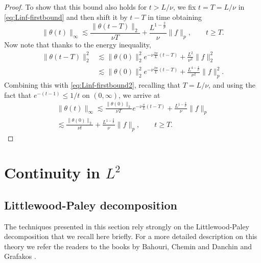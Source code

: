 \documentclass{amsart}
\numberwithin{Theorem}{section}
\theoremstyle{definition}
\theoremstyle{remark}
\renewcommand{\th}{\theta}
\begin{document}
\begin{proof}
To show that this bound also holds for $t>L/\nu$, we fix $t=T=L/\nu$ in \eqref{eq:Linf-firstbound}
and then shift it by $t-T$ in time obtaining
\begin{equation} \label{eq:Linf-firstbound2}
\|\theta(t)\|_\infty \lesssim \frac{\|\theta(t-T)\|_2}{\nu T} +\frac{L^{1-\frac2p}}{\nu} \|f\|_p, \qquad t\geq T.
\end{equation}
Now note that thanks to the energy inequality,
\[
\begin{split}
\|\th(t-T)\|_2^2 &\lesssim \|\th(0)\|_2^2 e^{-\nu \frac{2\pi}{L}(t-T)} + \frac{L^2}{\nu^2} \|f\|_2^2\\
&\lesssim \|\th(0)\|_2^2 e^{-\nu \frac{2\pi}{L}(t-T)} + \frac{L^{4-\frac4p}}{\nu^2} \|f\|_p^2.
\end{split}
\]
Combining this with \eqref{eq:Linf-firstbound2}, recalling that $T=L/\nu$, and using the fact that $e^{-(t-1)} \leq  1/t$
on $(0,\infty)$,  we arrive at
\[
\begin{split}
\|\theta(t)\|_\infty \lesssim \frac{\|\theta(0)\|_2}{\nu T}e^{-\nu \frac{\pi}{L}(t-T)} +\frac{L^{1-\frac2p}}{\nu} \|f\|_p\\
 \lesssim \frac{\|\theta(0)\|_2}{\nu t} +\frac{L^{1-\frac2p}}{\nu} \|f\|_p
,\qquad t\geq T.
\end{split}
\]



\end{proof}

\section{Continuity in $L^2$}
\label{sec:con}


\subsection{Littlewood-Paley decomposition}
\label{sec:LPD}
The techniques presented in this section rely strongly on the Littlewood-Paley decomposition that we recall here briefly. For a more detailed description on this theory we refer the readers to the books by Bahouri, Chemin and Danchin \cite{BCD} and Grafakos \cite{Gr}. 
\end{document}
